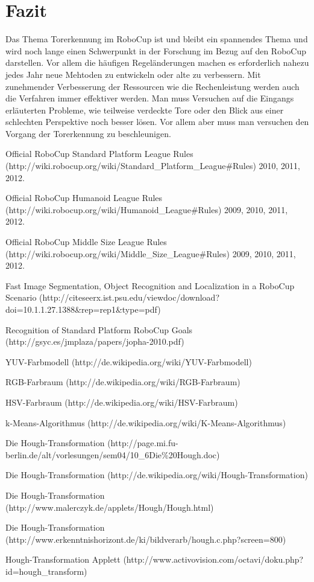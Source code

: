 \documentclass[a4paper,12pt]{article}
\begin{document}
\section{Fazit}
Das Thema Torerkennung im RoboCup ist und bleibt ein spannendes Thema und wird noch lange einen Schwerpunkt in der Forschung im Bezug auf den RoboCup darstellen. Vor allem die häufigen Regeländerungen machen es erforderlich nahezu jedes Jahr neue Mehtoden zu entwickeln oder alte zu verbessern. Mit zunehmender Verbesserung der Ressourcen wie die Rechenleistung werden auch die Verfahren immer effektiver werden. Man muss Versuchen auf die Eingangs erläuterten Probleme, wie teilweise verdeckte Tore oder den Blick aus einer schlechten Perspektive noch besser lösen. Vor allem aber muss man versuchen den Vorgang der Torerkennung zu beschleunigen.

\newpage

\begin{thebibliography}{9}

  Official RoboCup Standard Platform League Rules (http://wiki.robocup.org/wiki/Standard\_Platform\_League\#Rules)
  2010, 2011, 2012.

  Official RoboCup Humanoid League Rules (http://wiki.robocup.org/wiki/Humanoid\_League\#Rules)
  2009, 2010, 2011, 2012.  

  Official RoboCup Middle Size League Rules (http://wiki.robocup.org/wiki/Middle\_Size\_League\#Rules)
  2009, 2010, 2011, 2012.

  Fast Image Segmentation, Object Recognition and Localization in a RoboCup Scenario (http://citeseerx.ist.psu.edu/viewdoc/download?doi=10.1.1.27.1388\&rep=rep1\&type=pdf)

  Recognition of Standard Platform RoboCup Goals (http://gsyc.es/jmplaza/papers/jopha-2010.pdf)

  YUV-Farbmodell (http://de.wikipedia.org/wiki/YUV-Farbmodell)

  RGB-Farbraum (http://de.wikipedia.org/wiki/RGB-Farbraum)

  HSV-Farbraum (http://de.wikipedia.org/wiki/HSV-Farbraum)

  k-Means-Algorithmus (http://de.wikipedia.org/wiki/K-Means-Algorithmus)
  
  Die Hough-Transformation (http://page.mi.fu-berlin.de/alt/vorlesungen/sem04/10\_6Die\%20Hough.doc)
  
  Die Hough-Transformation (http://de.wikipedia.org/wiki/Hough-Transformation)

  Die Hough-Transformation (http://www.malerczyk.de/applets/Hough/Hough.html)
  
  Die Hough-Transformation (http://www.erkenntnishorizont.de/ki/bildverarb/hough.c.php?screen=800)
  
  Hough-Transformation Applett (http://www.activovision.com/octavi/doku.php?id=hough_transform)
\end{thebibliography}
\end{document}
